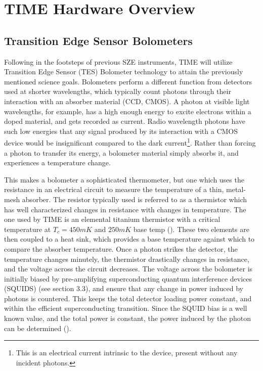 \documentclass[manuscript]{aastex}
\begin{document}
\newpage
\section{\textbf{TIME Hardware Overview}}
\subsection{\textbf{Transition Edge Sensor Bolometers}}
Following in the footsteps of previous SZE instruments, TIME will utilize Transition Edge Sensor (TES) Bolometer technology to attain the previously mentioned science goals. Bolometers perform a different function from detectors used at shorter wavelengths, which typically count photons through their interaction with an absorber material (CCD, CMOS). A photon at visible light wavelengths, for example, has a high enough energy to excite electrons within a doped material, and gets recorded as current. Radio wavelength photons have such low energies that any signal produced by its interaction with a CMOS device would be insignificant compared to the dark current\footnote{This is an electrical current intrinsic to the device, present without any incident photons.}. Rather than forcing a photon to transfer its energy, a bolometer material simply absorbs it, and experiences a temperature change.

This makes a bolometer a sophisticated thermometer, but one which uses the resistance in an electrical circuit to measure the temperature of a thin, metal-mesh absorber. The resistor typically used is referred to as a thermistor which has well characterized changes in resistance with changes in temperature. The one used by TIME is an elemental titanium thermistor with a critical temperature at \(T_{c} = 450 mK\) and \(250 mK\) base temp (\cite{Crites2014}). These two elements are then coupled to a heat sink, which provides a base temperature against which to compare the absorber temperature. Once a photon strikes the detector, the temperature changes minutely, the thermistor drastically changes in resistance, and the voltage across the circuit decreases. The voltage across the bolometer is initially biased by pre-amplifying superconducting quantum interference devices (SQUIDS) (see section 3.3), and ensure that any change in power induced by photons is countered. This keeps the total detector loading power constant, and within the efficient superconducting transition. Since the SQUID bias is a well known value, and the total power is constant, the power induced by the photon can be determined (\cite{O'Brient2010}).
\end{document}

